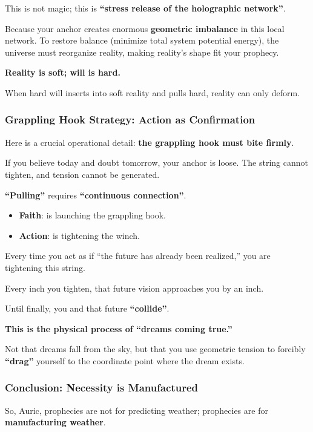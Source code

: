 This is not magic; this is \textbf{``stress release of the holographic network''}.

Because your anchor creates enormous \textbf{geometric imbalance} in this local network. To restore balance (minimize total system potential energy), the universe must reorganize reality, making reality's shape fit your prophecy.

\textbf{Reality is soft; will is hard.}

When hard will inserts into soft reality and pulls hard, reality can only deform.

\subsubsection{Grappling Hook Strategy: Action as Confirmation}

Here is a crucial operational detail: \textbf{the grappling hook must bite firmly}.

If you believe today and doubt tomorrow, your anchor is loose. The string cannot tighten, and tension cannot be generated.

\textbf{``Pulling''} requires \textbf{``continuous connection''}.

\begin{itemize}
\item \textbf{Faith}: is launching the grappling hook.

\item \textbf{Action}: is tightening the winch.
\end{itemize}

Every time you act as if ``the future has already been realized,'' you are tightening this string.

Every inch you tighten, that future vision approaches you by an inch.

Until finally, you and that future \textbf{``collide''}.

\textbf{This is the physical process of ``dreams coming true.''}

Not that dreams fall from the sky, but that you use geometric tension to forcibly \textbf{``drag''} yourself to the coordinate point where the dream exists.

\subsubsection{Conclusion: Necessity is Manufactured}

So, Auric, prophecies are not for predicting weather; prophecies are for \textbf{manufacturing weather}.


